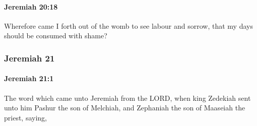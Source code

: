		\paragraph{Jeremiah 20:18} %
			\label{JEREMIAH-20-18}

			Wherefore came I forth out of the womb to see labour and sorrow, that my days should be consumed with shame?

	\subsubsection{Jeremiah 21} %
		\label{JEREMIAH-21}

		\paragraph{Jeremiah 21:1} %
			\label{JEREMIAH-21-1}

			The word which came unto Jeremiah from the LORD, when king Zedekiah sent unto him Pashur the son of Melchiah, and Zephaniah the son of Maaseiah the priest, saying,

